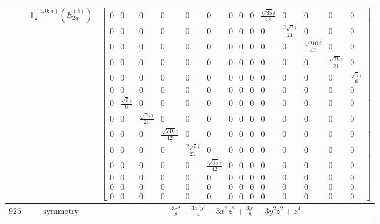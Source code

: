 \documentclass[fleqn,8pt,landscape]{jsarticle}
\begin{document}
\begin{longtable}{ccc}
$  $ & $ \mathbb{T}_{2}^{(1,0;a)}(E_{2g}^{(b)}) $ & $ \begin{bmatrix} 0 & 0 & 0 & 0 & 0 & 0 & 0 & 0 & 0 & \frac{\sqrt{35} i}{42} & 0 & 0 & 0 & 0 \\ 0 & 0 & 0 & 0 & 0 & 0 & 0 & 0 & 0 & 0 & \frac{2 \sqrt{7} i}{21} & 0 & 0 & 0 \\ 0 & 0 & 0 & 0 & 0 & 0 & 0 & 0 & 0 & 0 & 0 & \frac{\sqrt{210} i}{42} & 0 & 0 \\ 0 & 0 & 0 & 0 & 0 & 0 & 0 & 0 & 0 & 0 & 0 & 0 & \frac{\sqrt{70} i}{21} & 0 \\ 0 & 0 & 0 & 0 & 0 & 0 & 0 & 0 & 0 & 0 & 0 & 0 & 0 & \frac{\sqrt{5} i}{6} \\ 0 & 0 & 0 & 0 & 0 & 0 & 0 & 0 & 0 & 0 & 0 & 0 & 0 & 0 \\ 0 & \frac{\sqrt{5} i}{6} & 0 & 0 & 0 & 0 & 0 & 0 & 0 & 0 & 0 & 0 & 0 & 0 \\ 0 & 0 & \frac{\sqrt{70} i}{21} & 0 & 0 & 0 & 0 & 0 & 0 & 0 & 0 & 0 & 0 & 0 \\ 0 & 0 & 0 & \frac{\sqrt{210} i}{42} & 0 & 0 & 0 & 0 & 0 & 0 & 0 & 0 & 0 & 0 \\ 0 & 0 & 0 & 0 & \frac{2 \sqrt{7} i}{21} & 0 & 0 & 0 & 0 & 0 & 0 & 0 & 0 & 0 \\ 0 & 0 & 0 & 0 & 0 & \frac{\sqrt{35} i}{42} & 0 & 0 & 0 & 0 & 0 & 0 & 0 & 0 \\ 0 & 0 & 0 & 0 & 0 & 0 & 0 & 0 & 0 & 0 & 0 & 0 & 0 & 0 \\ 0 & 0 & 0 & 0 & 0 & 0 & 0 & 0 & 0 & 0 & 0 & 0 & 0 & 0 \\ 0 & 0 & 0 & 0 & 0 & 0 & 0 & 0 & 0 & 0 & 0 & 0 & 0 & 0 \end{bmatrix} $ \\ \hline
$ 925 $ & $ \text{symmetry} $ & $ \frac{3 x^{4}}{8} + \frac{3 x^{2} y^{2}}{4} - 3 x^{2} z^{2} + \frac{3 y^{4}}{8} - 3 y^{2} z^{2} + z^{4} $ \\

\end{longtable}
\end{document}

